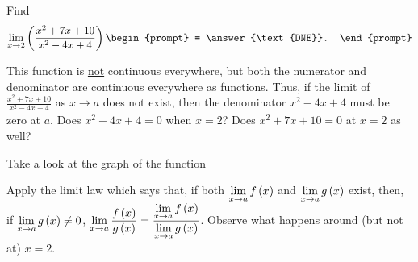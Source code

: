 \documentclass{ximera}
\author{Gregory Hartman \and Matthew Carr}
\begin{document}
\begin{exercise}




  Find 
  \[
  \lim_{x\to 2} \p{\frac{x^2+7x+10}{x^2-4x+4}}
  \begin{prompt}
  = \answer{\text{DNE}}.
  \end{prompt}
  \]
    \begin{hint}
     This function is \underline{not} continuous everywhere, but both the numerator and denominator are continuous everywhere as functions. Thus, if the limit of $\frac{x^2+7x+10}{x^2-4x+4}$ as $x\to{a}$ does not exist, then the denominator $x^2-4x+4$ must be zero at $a$. Does $x^2-4x+4=0$ when $x=2$? Does $x^2+7x+10=0$ at $x=2$ as well?
    \end{hint}
     \begin{hint}
    	Take a look at the graph of the function
    \begin{center}
      \end{center} 
      Apply the limit law which says that, if both $\lim_{x\to a}f\p{x}$ and $\lim_{x\to a}g\p{x}$ exist, then, if $\lim_{x\to a}g\p{x}\ne0$, $\lim_{x\to{a}}\frac{f\p{x}}{g\p{x}}=\frac{\lim_{x\to a}f\p{x}}{\lim_{x\to{a}}g\p{x}}$. Observe what happens around (but not at) $x=2$.
    \end{hint}
    \begin{hint}

\end{hint}
\end{exercise}
\end{document}

